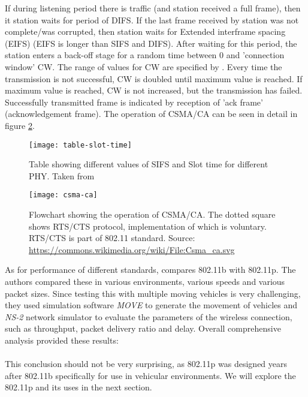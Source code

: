 % 
If during listening period there is traffic (and station received a full frame), then it station waits for period of DIFS. If the last frame received by station was not complete/was corrupted, then station waits for Extended interframe spacing (EIFS) (EIFS is longer than SIFS and DIFS). After waiting for this period, the station enters a back-off stage for a random time between 0 and 'connection window' CW. The range of values for CW are specified by \cite{2016IEEEAccess.}. Every time the transmission is not successful, CW is doubled until maximum value is reached. If maximum value is reached, CW is not increased, but the transmission has failed. Successfully transmitted frame is indicated by reception of 'ack frame' (acknowledgement frame). The operation of CSMA/CA can be seen in detail in figure \ref{fig:csma-ca}.\par
% 
% 
\begin{figure}[h]
    \centering
    \texttt{[image: table-slot-time]}
    \caption{Table showing different values of SIFS and Slot time for different PHY. Taken from \cite{Aboul-Magd2008WirelessPerspective}}
    \label{fig:table-st}
\end{figure}
% 
\begin{figure}
    \centering
    \texttt{[image: csma-ca]}
    \caption{Flowchart showing the operation of CSMA/CA. The dotted square shows RTS/CTS protocol, implementation of which is voluntary. RTS/CTS is part of 802.11 standard. Source: \url{https://commons.wikimedia.org/wiki/File:Csma_ca.svg}}
    \label{fig:csma-ca}
\end{figure}
% 
As for performance of different standards, \cite{Bilgin2013PerformanceAreas} compares 802.11b with 802.11p. The authors compared these in various environments, various speeds and various packet sizes. Since testing this with multiple moving vehicles is very challenging, they used simulation software \emph{MOVE} to generate the movement of vehicles and \emph{NS-2} network simulator to evaluate the parameters of the wireless connection, such as throughput, packet delivery ratio and delay. 
Overall comprehensive analysis provided these results:\\ \\
This conclusion should not be very surprising, as 802.11p was designed years after 802.11b specifically for use in vehicular environments. We will explore the 802.11p and its uses in the next section.